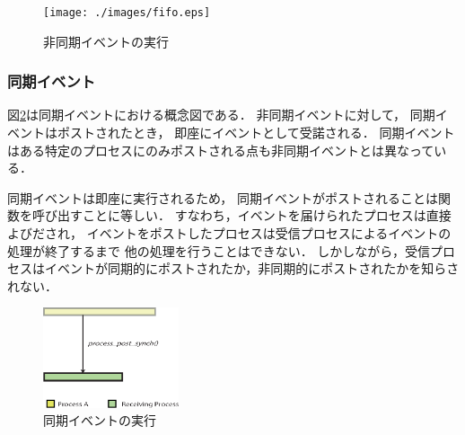 \begin{figure}[htbp]
 \begin{center}
  \texttt{[image: ./images/fifo.eps]}
 \end{center}
 \caption{非同期イベントの実行}
 \label{fig:asynchronous_event}
\end{figure}




\subsubsection{同期イベント}

\vspace{0.5em}図\ref{fig:synchronous_event}は同期イベントにおける概念図である．
非同期イベントに対して，
同期イベントはポストされたとき，
即座にイベントとして受諾される．
同期イベントはある特定のプロセスにのみポストされる点も非同期イベントとは異なっている．

同期イベントは即座に実行されるため，
同期イベントがポストされることは関数を呼び出すことに等しい．
すなわち，イベントを届けられたプロセスは直接よびだされ，
イベントをポストしたプロセスは受信プロセスによるイベントの処理が終了するまで
他の処理を行うことはできない．
しかしながら，受信プロセスはイベントが同期的にポストされたか，非同期的にポストされたかを知らされない．

\begin{figure}[htbp]
 \begin{center}
  \includegraphics[width=40mm]{./images/synchronous_event.eps}
 \end{center}
 \caption{同期イベントの実行}
 \label{fig:synchronous_event}
\end{figure}


